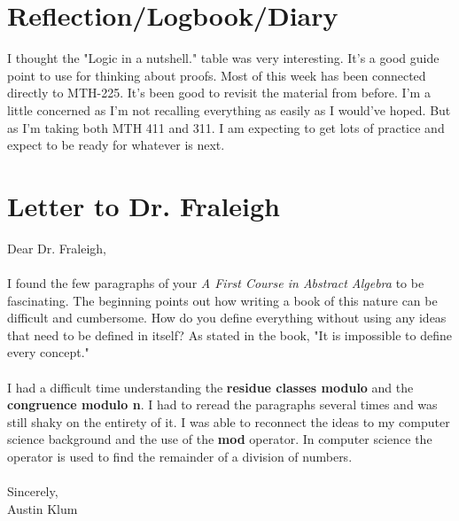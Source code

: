\documentclass[11pt]{article}
\theoremstyle{plain}
\theoremstyle{definition}
\begin{document}
\section{Reflection/Logbook/Diary}
I thought the "Logic in a nutshell." table was very interesting. It's a good guide point to use for thinking about proofs. Most of this week has been connected directly to MTH-225. It's been good to revisit the material from before. I'm a little concerned as I'm not recalling everything as easily as I would've hoped. But as I'm taking both MTH 411 and 311. I am expecting to get lots of practice and expect to be ready for whatever is next.

\section{Letter to Dr. Fraleigh}
Dear Dr. Fraleigh,\\
\\
I found the few paragraphs of your \textit{A First Course in Abstract Algebra} to be fascinating. The beginning points out how writing a book of this nature can be difficult and cumbersome. How do you define everything without using any ideas that need to be defined in itself? As stated in the book, "It is impossible to define every concept." \\
\\
I had a difficult time understanding the \textbf{residue classes modulo} and the \textbf{congruence modulo n}. I had to reread the paragraphs several times and was still shaky on the entirety of it. I was able to reconnect the ideas to my computer science background and the use of the \textbf{mod} operator. In computer science the operator is used to find the remainder of a division of numbers. \\
\\
Sincerely,\\
Austin Klum
\end{document}
